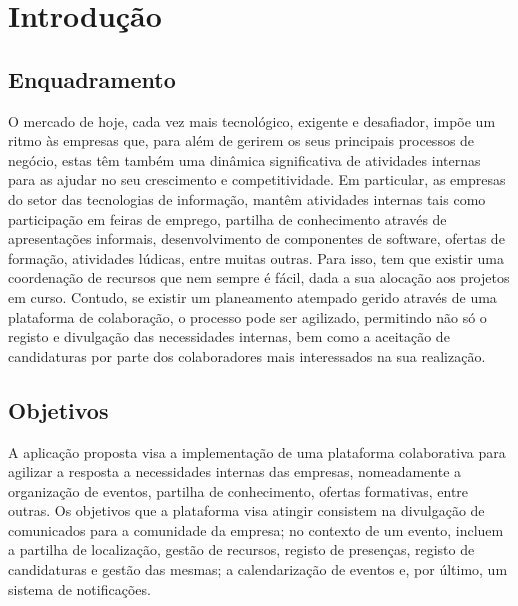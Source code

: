 \chapter{Introdução}\label{sec:intro}

\section{Enquadramento}\label{sec:enquadramento}
O mercado de hoje, cada vez mais tecnológico, exigente e desafiador, impõe um ritmo às empresas que, para
além de gerirem os seus principais processos de negócio, estas têm também uma dinâmica significativa de
atividades internas para as ajudar no seu crescimento e competitividade. Em particular, as empresas do setor
das tecnologias de informação, mantêm atividades internas tais como participação em feiras de emprego,
partilha de conhecimento através de apresentações informais, desenvolvimento de componentes de software,
ofertas de formação, atividades lúdicas, entre muitas outras. Para isso, tem que existir uma coordenação de
recursos que nem sempre é fácil, dada a sua alocação aos projetos em curso. Contudo, se existir um
planeamento atempado gerido através de uma plataforma de colaboração, o processo pode ser agilizado,
permitindo não só o registo e divulgação das necessidades internas, bem como a aceitação de candidaturas por
parte dos colaboradores mais interessados na sua realização.

\section{Objetivos}\label{sec:objectivos}
A aplicação proposta visa a implementação de uma plataforma colaborativa para agilizar a resposta a necessidades internas das empresas, nomeadamente a
organização de eventos, partilha de conhecimento, ofertas formativas, entre outras. 
Os objetivos que a plataforma visa atingir consistem na divulgação de comunicados para a comunidade da empresa;
no contexto de um evento, incluem a partilha de localização, 
gestão de recursos, registo de presenças, registo de candidaturas e gestão das mesmas; 
a calendarização de eventos e, por último, um sistema de notificações.